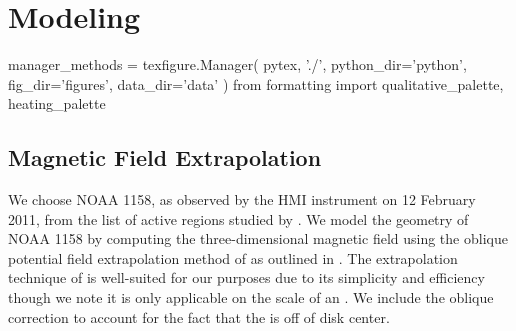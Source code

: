\section{Modeling}\label{modeling}

\begin{pycode}
manager_methods = texfigure.Manager(
    pytex, './',
    python_dir='python',
    fig_dir='figures',
    data_dir='data'
)
from formatting import qualitative_palette, heating_palette
\end{pycode}

\subsection{Magnetic Field Extrapolation}\label{field}

We choose \AR{} NOAA 1158, as observed by the HMI instrument \citet{hoeksema_helioseismic_2014} on 12 February 2011, from the list of active regions studied by \citet{warren_systematic_2012}. We model the geometry of \AR{} NOAA 1158 by computing the three-dimensional magnetic field using the oblique potential field extrapolation method of \citet{schmidt_observable_1964} as outlined in \citet[section 3]{sakurai_greens_1982}. The extrapolation technique of \citeauthor{schmidt_observable_1964} is well-suited for our purposes due to its simplicity and efficiency though we note it is only applicable on the scale of an \AR{}. We include the oblique correction to account for the fact that the \AR{} is off of disk center.

